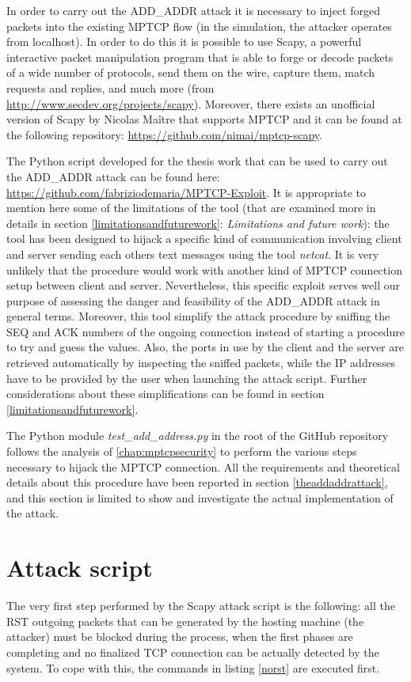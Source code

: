 In order to carry out the ADD\_ADDR attack it is necessary to inject forged packets into the existing MPTCP flow (in the simulation, the attacker operates from localhost). In order to do this it is possible to use Scapy, a powerful interactive packet manipulation program that is able to forge or decode packets of a wide number of protocols, send them on the wire, capture them, match requests and replies, and much more (from \url{http://www.secdev.org/projects/scapy}). Moreover, there exists an unofficial version of Scapy by Nicolas Maître that supports MPTCP and it can be found at the following repository: \url{https://github.com/nimai/mptcp-scapy}.

The Python script developed for the thesis work that can be used to carry out the ADD\_ADDR attack can be found here: \url{https://github.com/fabriziodemaria/MPTCP-Exploit}. It is appropriate to mention here some of the limitations of the tool (that are examined more in details in section \ref{limitationsandfuturework}: \textit{Limitations and future work}): the tool has been designed to hijack a specific kind of communication involving client and server sending each others text messages using the tool \textit{netcat}. It is very unlikely that the procedure would work with another kind of MPTCP connection setup between client and server. Nevertheless, this specific exploit serves well our purpose of assessing the danger and feasibility of the ADD\_ADDR attack in general terms.
Moreover, this tool simplify the attack procedure by sniffing the SEQ and ACK numbers of the ongoing connection instead of starting a procedure to try and guess the values. Also, the ports in use by the client and the server are retrieved automatically by inspecting the sniffed packets, while the IP addresses have to be provided by the user when launching the attack script. Further considerations about these simplifications can be found in section \ref{limitationsandfuturework}.

The Python module \textit{test\_add\_address.py} in the root of the GitHub repository follows the analysis of \autoref{chap:mptcpsecurity} to perform the various steps necessary to hijack the MPTCP connection. All the requirements and theoretical details about this procedure have been reported in section \ref{theaddaddrattack}, and this section is limited to show and investigate the actual implementation of the attack.

\section{Attack script}
The very first step performed by the Scapy attack script is the following: all the RST outgoing packets that can be generated by the hosting machine (the attacker) must be blocked during the process, when the first phases are completing and no finalized TCP connection can be actually detected by the system. To cope with this, the commands in listing \ref{norst} are executed first.


